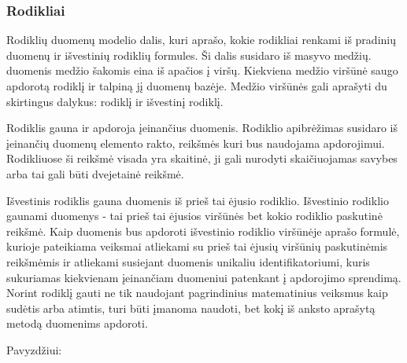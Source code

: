 \documentclass{VUMIFPSbakalaurinis}
\begin{document}
\subsubsection{Rodikliai}
Rodiklių duomenų modelio dalis, kuri aprašo, kokie rodikliai renkami iš pradinių duomenų ir išvestinių rodiklių formules. 
Ši dalis susidaro iš masyvo medžių. duomenis medžio šakomis eina iš apačios į viršų. Kiekviena medžio viršūnė saugo apdorotą rodiklį ir talpiną jį duomenų bazėje. Medžio viršūnės gali aprašyti du skirtingus dalykus: rodiklį ir išvestinį rodiklį. \par
Rodiklis gauna ir apdoroja įeinančius duomenis. Rodiklio apibrėžimas susidaro iš įeinančių duomenų elemento rakto, reikšmės kuri bus naudojama apdorojimui. Rodikliuose ši reikšmė visada yra skaitinė, ji gali nurodyti skaičiuojamas savybes arba tai gali būti dvejetainė reikšmė. \par
Išvestinis rodiklis gauna duomenis iš prieš tai ėjusio rodiklio. Išvestinio rodiklio gaunami duomenys - tai prieš tai ėjusios viršūnės bet kokio rodiklio paskutinė reikšmė. Kaip duomenis bus apdoroti išvestinio rodiklio viršūnėje aprašo formulė, kurioje pateikiama veiksmai atliekami su prieš tai ėjusių viršūnių paskutinėmis reikšmėmis ir atliekami susiejant duomenis unikaliu identifikatoriumi, kuris sukuriamas kiekvienam įeinančiam duomeniui patenkant į apdorojimo sprendimą. Norint rodiklį gauti ne tik naudojant pagrindinius matematinius veiksmus kaip sudėtis arba atimtis, turi būti įmanoma naudoti, bet kokį iš anksto aprašytą metodą duomenims apdoroti. \par
Pavyzdžiui:
\end{document}

